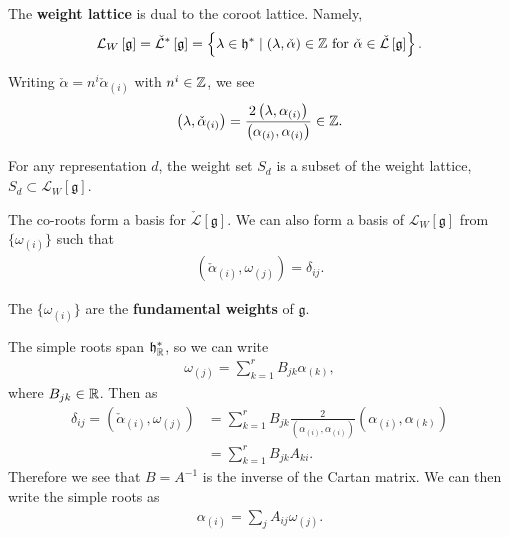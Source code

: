 \begin{definition}
    The \textbf{weight lattice} is dual to the coroot lattice. Namely,
    \begin{align}
        \mathcal{L}_W \left[ \mathfrak{g} \right] = \check{\mathcal{L}}^{*}\left[ \mathfrak{g} \right] = \left\{ \lambda \in \mathfrak{h}^{*}  \mid  \left( \lambda, \check{\alpha} \right) \in \mathbb{Z} \text{~for~} \check{\alpha} \in \check{\mathcal{L}} \left[ \mathfrak{g} \right] \right\} 
    .\end{align}
\end{definition}

Writing $\check{\alpha} = n^{i} \check{\alpha}_{\left( i \right) }$ with $n^{i} \in \mathbb{Z}$, we see
\begin{align}
    \left( \lambda, \check{\alpha}_{\left( i \right) } \right) = \frac{2 \left( \lambda , \alpha_{\left( i \right) }\right) }{\left( \alpha_{\left( i \right) }, \alpha_{\left( i \right) } \right) } \in \mathbb{Z}
.\end{align}

For any representation $d$, the weight set $S_d$ is a subset of the weight lattice, $S_d \subset \mathcal{L}_W \left[ \mathfrak{g} \right] $.

The co-roots form a basis for $\check{\mathcal{L}}\left[ \mathfrak{g} \right] $. We can also form a basis of $\mathcal{L}_W \left[ \mathfrak{g} \right] $ from $\{\omega_{\left( i \right) }\} $ such that 
\begin{align}
    \left( \check{\alpha}_{\left( i \right) }, \omega_{\left( j \right) } \right) = \delta_{ij}
.\end{align}

\begin{definition}
    The $\{\omega_{\left( i \right) }\} $ are the \textbf{fundamental weights} of $\mathfrak{g}$.
\end{definition}

The simple roots span $\mathfrak{h}^{*}_{\mathbb{R}}$, so we can write
\begin{align}
    \omega_{\left( j \right) } = \sum_{k=1}^{r}  B_{jk} \alpha_{\left( k \right) }
,\end{align}
where $B_{jk} \in \mathbb{R}$. Then as
\begin{align}
    \delta_{ij} = \left( \check{\alpha}_{\left( i \right) }, \omega_{\left( j \right) } \right) &= \sum_{k=1}^{r}  B_{jk} \frac{2}{\left( \alpha_{\left( i \right) } , \alpha_{\left( i \right) } \right) } \left( \alpha_{\left( i \right) }, \alpha_{\left( k \right) } \right)  \\
     &= \sum_{k=1}^{r}  B_{jk} A_{ki}
.\end{align}
Therefore we see that $B = A^{-1}$ is the inverse of the Cartan matrix. We can then write the simple roots as
\begin{align}
    \alpha_{\left( i \right) } = \sum_{j}^{}  A_{ij} \omega_{\left( j \right) }
.\end{align}

